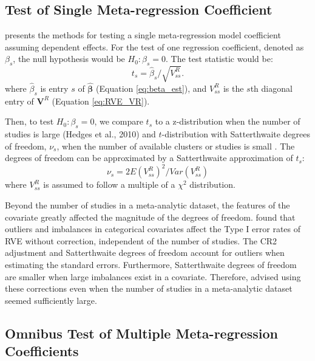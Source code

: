 \subsection{Test of Single Meta-regression Coefficient}

\textcite{tipton2015a} presents the methods for testing a single meta-regression model coefficient assuming dependent effects. For the test of one regression coefficient, denoted as $\beta_s$, the null hypothesis would be $H_0: \beta_s = 0$. The test statistic would be:
\begin{equation}
    t_s = \hat{\beta}_s/\sqrt{V^R_{ss}}. 
\end{equation}
where $\hat{\beta}_s$ is entry $s$ of $\bm{\hat{\beta}}$ (Equation \ref{eq:beta_est}), and $V^R_{ss}$ is the $s$th diagonal entry of $\mathbf{V}^R$ (Equation \ref{eq:RVE_VR}).

Then, to test $H_0: \beta_s = 0$, we compare $t_s$ to a z-distribution when the number of studies is large (Hedges et al., 2010) and $t$-distribution with Satterthwaite degrees of freedom, $\nu_s$, when the number of available clusters or studies is small \autocite{tipton2015a}. The degrees of freedom can be approximated by a Satterthwaite approximation of $t_s$:
\begin{equation} \label{eq: satt formulation}
    \nu_s = 2E(V^R_{ss})^2 / Var(V^R_{ss})
\end{equation}
where $V^R_{ss}$ is assumed to follow a multiple of a $\chi^2$ distribution. 

Beyond the number of studies in a meta-analytic dataset, the features of the covariate greatly affected the magnitude of the degrees of freedom. \textcite{tipton2015a} found that outliers and imbalances in categorical covariates affect the Type I error rates of RVE without correction, independent of the number of studies. The CR2 adjustment and Satterthwaite degrees of freedom account for outliers when estimating the standard errors. Furthermore, Satterthwaite degrees of freedom are smaller when large imbalances exist in a covariate. Therefore, \textcite{tipton2015a} advised using these corrections even when the number of studies in a meta-analytic dataset seemed sufficiently large. 

\subsection{Omnibus Test of Multiple Meta-regression Coefficients}


